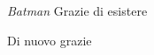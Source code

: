 
\thispagestyle{empty}


\vspace*{3cm}

\begin{center}
\emph{Batman} Grazie di esistere    
\end{center}

\medskip

\begin{center}
Di nuovo grazie
\end{center}